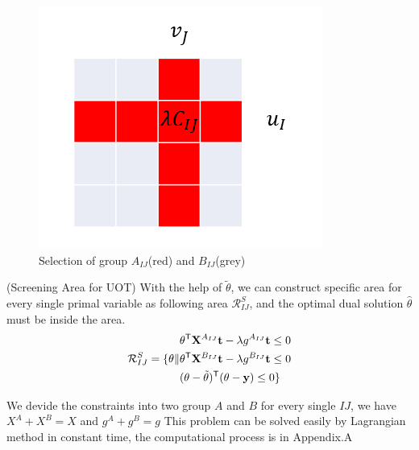 	\begin{figure}[h]
	\begin{center}	
	\includegraphics[width = \linewidth]{pic/divide}
	\caption{Selection of group $A_{IJ}$(red) and $B_{IJ}$(grey)}
	\end{center}	
	\end{figure}

\begin{thm}\label{area}(Screening Area for UOT) With the help of $\tilde{\theta}$, we can construct specific area for every single primal variable as following area $\mathcal{R}^{S}_{IJ}$, and the optimal dual solution $\hat{\theta}$ must be inside the area.
 \begin{equation}
\begin{split} 
\mathcal{R}^S_{IJ} = \{ \theta \|
\begin{aligned}
 &\theta^{\mathsf T}\mathbf{X}^{A_{IJ}}\mathbf t - \lambda g^{A_{IJ}}\mathbf t\leq 0 \\
  &\theta^{\mathsf T}\mathbf{X}^{B_{IJ}}\mathbf t - \lambda g^{B_{IJ}}\mathbf t \leq 0\\
   &(\theta-\tilde{\theta})^{\mathsf T}(\theta-\mathbf y)\leq 0\}
\end{aligned}
\end{split}
\label{eq:divide}
\end{equation}
\end{thm}
We devide the constraints into two group $A$ and $B$ for every single $IJ$, we have $X^A +X^B=X$ and $g^A+g^B = g$
This problem can be solved easily by Lagrangian method in constant time, the computational process is in Appendix.A


